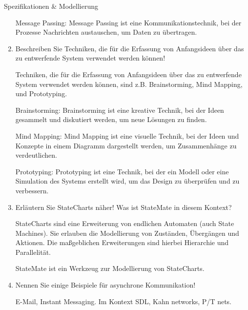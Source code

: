 \documentclass{article}
\begin{document}
\begin{exercise}{Spezifikationen \& Modellierung}
\begin{enumerate}
\begin{solution}
            Message Passing: Message Passing ist eine Kommunikationstechnik, bei der Prozesse Nachrichten austauschen, um Daten zu übertragen.
          \end{solution}

    \item Beschreiben Sie Techniken, die für die Erfassung von Anfangsideen über das zu entwerfende System verwendet werden können!

          \begin{solution}
            Techniken, die für die Erfassung von Anfangsideen über das zu entwerfende System verwendet werden können, sind z.B. Brainstorming, Mind Mapping, und Prototyping.

            Brainstorming: Brainstorming ist eine kreative Technik, bei der Ideen gesammelt und diskutiert werden, um neue Lösungen zu finden.

            Mind Mapping: Mind Mapping ist eine visuelle Technik, bei der Ideen und Konzepte in einem Diagramm dargestellt werden, um Zusammenhänge zu verdeutlichen.

            Prototyping: Prototyping ist eine Technik, bei der ein Modell oder eine Simulation des Systems erstellt wird, um das Design zu überprüfen und zu verbessern.
          \end{solution}

    \item Erläutern Sie StateCharts näher! Was ist StateMate in diesem Kontext?

          \begin{solution}
            StateCharts sind eine Erweiterung von endlichen Automaten (auch State Machines). Sie erlauben die Modellierung von Zuständen, Übergängen und Aktionen. Die maßgeblichen Erweiterungen sind hierbei Hierarchie und Parallelität.

            StateMate ist ein Werkzeug zur Modellierung von StateCharts.
          \end{solution}

    \item Nennen Sie einige Beispiele für asynchrone Kommunikation!

          \begin{solution}
            E-Mail, Instant Messaging. Im Kontext SDL, Kahn networks, P/T nets.
          \end{solution}
  \end{enumerate}
\end{exercise}
\end{document}
